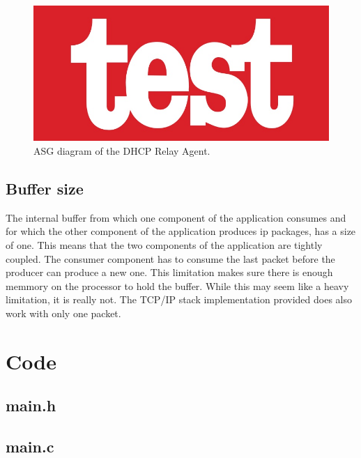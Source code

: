 \documentclass[11pt,a4paper]{scrartcl}
\begin{document}
\begin{figure}
	\label{fig:asg}
	\centering
	\includegraphics[width=1.0\textwidth]{ASG.jpg}
	\caption{ASG diagram of the DHCP Relay Agent.}
\end{figure}

\subsection{Buffer size}
The internal buffer from which one component of the application consumes and for which the other component of the application produces ip packages, has a size of one. This means that the two components of the application are tightly coupled. The consumer component has to consume the last packet before the producer can produce a new one. This limitation makes sure there is enough memmory on the processor to hold the buffer. While this may seem like a heavy limitation, it is really not. The TCP/IP stack implementation provided does also work with only one packet. 

\subsection{}

\newpage

\appendix
\section{Code}

\subsection{main.h}


\subsection{main.c}

\end{document}
